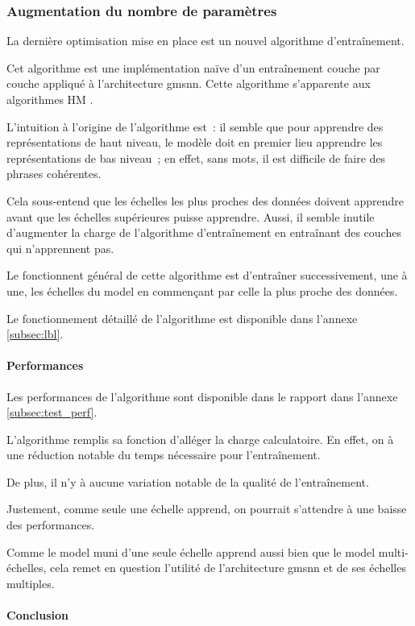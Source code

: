 \subsubsection{Augmentation du nombre de paramètres}\label{subsec:optilbl}
La dernière optimisation mise en place est un nouvel algorithme d'entraînement.

Cet algorithme est une implémentation naïve d'un entraînement couche par couche appliqué à l'architecture \gls{gmsnn}. Cette algorithme s'apparente aux algorithmes HM \autocite{hm}.

L'intuition à l'origine de l'algorithme est~:
il semble que pour apprendre des représentations de haut niveau, le modèle doit en premier lieu apprendre les représentations de bas niveau~;
en effet, sans mots, il est difficile de faire des phrases cohérentes.

Cela sous-entend que les échelles les plus proches des données doivent apprendre avant que les échelles supérieures puisse apprendre.
Aussi, il semble inutile d'augmenter la charge de l'algorithme d'entraînement en entraînant des couches qui n'apprennent pas.

Le fonctionnent général de cette algorithme est d'entraîner successivement, une à une, les échelles du \gls{model} en commençant par celle la plus proche des données.

Le fonctionnement détaillé de l'algorithme est disponible dans l'annexe \ref{subsec:lbl}.

\paragraph{Performances}
Les performances de l'algorithme sont disponible dans le rapport dans l'annexe \ref{subsec:test_perf}.

L'algorithme remplis sa fonction d'alléger la charge calculatoire. En effet, on à une réduction notable du temps nécessaire pour l'entraînement. %

De plus, il n'y à aucune variation notable de la qualité de l'entraînement.

Justement, comme seule une échelle apprend, on pourrait s'attendre à une baisse des performances.%

Comme le \gls{model} muni d'une seule échelle apprend aussi bien que le \gls{model} multi-échelles, cela remet en question l'utilité de l'architecture \gls{gmsnn} et de ses échelles multiples.

\paragraph{Conclusion}
